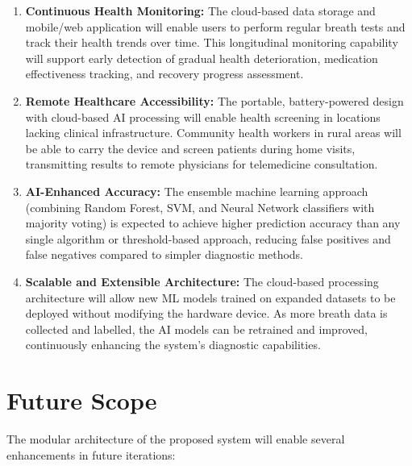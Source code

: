 \begin{enumerate}[leftmargin=1.5cm]
\item \textbf{Continuous Health Monitoring:} The cloud-based data storage and mobile/web application will enable users to perform regular breath tests and track their health trends over time. This longitudinal monitoring capability will support early detection of gradual health deterioration, medication effectiveness tracking, and recovery progress assessment.

\item \textbf{Remote Healthcare Accessibility:} The portable, battery-powered design with cloud-based AI processing will enable health screening in locations lacking clinical infrastructure. Community health workers in rural areas will be able to carry the device and screen patients during home visits, transmitting results to remote physicians for telemedicine consultation.

\item \textbf{AI-Enhanced Accuracy:} The ensemble machine learning approach (combining Random Forest, SVM, and Neural Network classifiers with majority voting) is expected to achieve higher prediction accuracy than any single algorithm or threshold-based approach, reducing false positives and false negatives compared to simpler diagnostic methods.

\item \textbf{Scalable and Extensible Architecture:} The cloud-based processing architecture will allow new ML models trained on expanded datasets to be deployed without modifying the hardware device. As more breath data is collected and labelled, the AI models can be retrained and improved, continuously enhancing the system's diagnostic capabilities.
\end{enumerate}

\section{Future Scope}
The modular architecture of the proposed system will enable several enhancements in future iterations:

